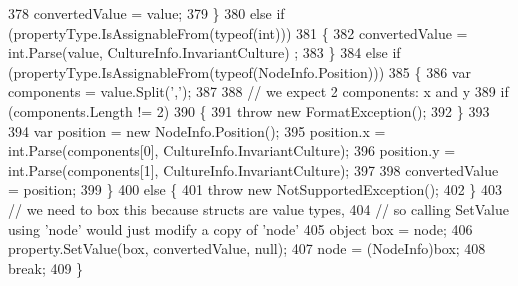 \begin{DoxyCode}
378                                             convertedValue = value;
379                                         \}
380                                         \textcolor{keywordflow}{else} \textcolor{keywordflow}{if} (propertyType.IsAssignableFrom(typeof(\textcolor{keywordtype}{int})))
381                                         \{
382                                             convertedValue = int.Parse(value, CultureInfo.InvariantCulture)
      ;
383                                         \}
384                                         \textcolor{keywordflow}{else} \textcolor{keywordflow}{if} (propertyType.IsAssignableFrom(typeof(NodeInfo.Position)))
385                                         \{
386                                             var components = value.Split(\textcolor{charliteral}{','});
387 
388                                             \textcolor{comment}{// we expect 2 components: x and y}
389                                             \textcolor{keywordflow}{if} (components.Length != 2)
390                                             \{
391                                                 \textcolor{keywordflow}{throw} \textcolor{keyword}{new} FormatException();
392                                             \}
393 
394                                             var position = \textcolor{keyword}{new} NodeInfo.Position();
395                                             position.x = int.Parse(components[0], 
      CultureInfo.InvariantCulture);
396                                             position.y = int.Parse(components[1], 
      CultureInfo.InvariantCulture);
397 
398                                             convertedValue = position;
399                                         \}
400                                         \textcolor{keywordflow}{else} \{
401                                             \textcolor{keywordflow}{throw} \textcolor{keyword}{new} NotSupportedException();
402                                         \}
403                                         \textcolor{comment}{// we need to box this because structs are value types,}
404                                         \textcolor{comment}{// so calling SetValue using 'node' would just modify a copy of
       'node'}
405                                         \textcolor{keywordtype}{object} box = node;
406                                         property.SetValue(box, convertedValue, null);
407                                         node = (NodeInfo)box;
408                                         \textcolor{keywordflow}{break};
409                                     \}

\end{DoxyCode}
